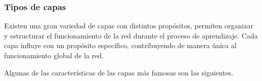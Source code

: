 
\subsubsection{Tipos de capas}



Existen una gran variedad de capas con distintos propósitos, permiten organizar y estructurar el funcionamiento de la red durante el proceso de aprendizaje. Cada capa influye con un propósito específico, contribuyendo de manera única al funcionamiento global de la red.

Algunas de las características de las capas más famosas son las siguientes.

